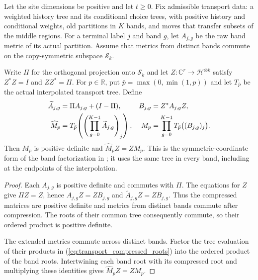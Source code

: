 \begin{theorem}
    \label{thm:replica_transport_root_compression}
    \leanok
    Let the site dimensions be positive and let $t\geq 0$.
    Fix admissible transport data: a weighted history tree and its conditional
    choice trees, with positive history and conditional weights, old
    partitions in $K$ bands, and moves that transfer subsets of the middle
    regions. For a terminal label $j$ and band $g$, let $A_{j,g}$ be the raw
    band metric of its actual partition. Assume that metrics from distinct
    bands commute on the copy-symmetric subspace $\mathcal S_k$.

    Write $\Pi$ for the orthogonal projection onto $\mathcal S_k$ and let
    $Z:\mathbb C^r\longrightarrow\mathcal H^{\otimes k}$ satisfy
    $Z^*Z=I$ and $ZZ^*=\Pi$.
    For $p\in\mathbb R$, put $\bar p=\max(0,\min(1,p))$ and let
    $T_{\bar p}$ be the actual interpolated transport tree. Define
    \begin{align}
        \widetilde A_{j,g}&=\Pi A_{j,g}+(I-\Pi),&
        B_{j,g}&=Z^*A_{j,g}Z,\notag\\
        \widehat M_p&=T_{\bar p}\!\left(
          \left(\prod_{g=0}^{K-1}\widetilde A_{j,g}\right)_j\right),&
        M_p&=\prod_{g=0}^{K-1}T_{\bar p}\bigl((B_{j,g})_j\bigr).
        \label{eq:transport_compressed_roots}
    \end{align}
    Then $M_p$ is positive definite and $\widehat M_p Z=ZM_p$.
    This is the symmetric-coordinate form of the band factorization in
    \cite[Sections~7 and~8]{OpenAI2026AreaLaw}; it uses the same tree in
    every band, including at the endpoints of the interpolation.
\end{theorem}
\begin{proof}
    \leanok
    Each $A_{j,g}$ is positive definite and commutes with $\Pi$.
    The equations for $Z$ give $\Pi Z=Z$, hence
    $A_{j,g}Z=ZB_{j,g}$ and $\widetilde A_{j,g}Z=ZB_{j,g}$.
    Thus the compressed matrices are positive definite and metrics from
    distinct bands commute after compression. The roots of their common
    tree consequently commute, so their ordered product is positive definite.

    The extended metrics commute across distinct bands. Factor the tree
    evaluation of their products in (\ref{eq:transport_compressed_roots})
    into the ordered product of the band roots. Intertwining each band root
    with its compressed root and multiplying these identities gives
    $\widehat M_pZ=ZM_p$.
\end{proof}
